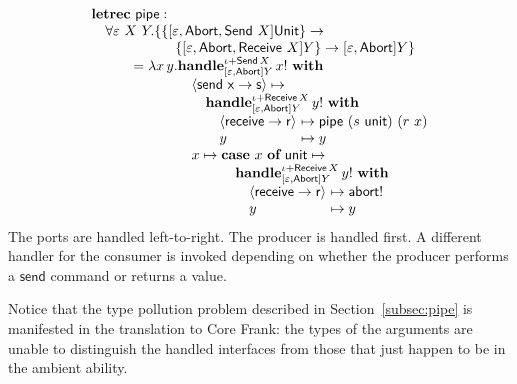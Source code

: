 \documentclass[11pt]{article}
\makeatletter
\newcommand\ba{\begin{array}}
\newcommand\ea{\end{array}}
\newcommand{\bl}{\ba[t]{@{}l@{}}}
\newcommand{\el}{\ea}
\newcommand{\effbox}[1]{[#1]}
\newcommand{\key}[1]{\textbf{#1}} %
\newcommand{\op}{\mathsf}  %
\newcommand{\con}{\mathsf} %
\newcommand{\inter}{\mathsf} %
\newcommand{\handleSymbol}{\rightarrow}
\newcommand{\handle}[2]{{#1} \handleSymbol {#2}}
\newcommand{\thunk}[1]{\{{#1}\}}
\newcommand{\evd}{\varepsilon}
\newcommand{\effin}[1]{\langle {#1} \rangle}
\newcommand{\id}{\iota}
\makeatother
\begin{document}
\[
\bl
\key{letrec}~
  \op{pipe} : \\
    \quad \forall \evd~X~Y. \{\bl
              \thunk{\effbox{\evd, \inter{Abort}, \inter{Send}~X}\con{Unit}} \to \\
              \quad \thunk{\effbox{\evd, \inter{Abort}, \inter{Receive}~X}Y} \to
                \effbox{\evd, \inter{Abort}}Y\} \\
              \el \\
\quad\qquad =
  \lambda x\,y.
    \bl
    \key{handle}^{\id + \inter{Send}\,X}_{\effbox{\evd, \inter{Abort}}Y}\,x!~\key{with} \\
       \ba{@{}r@{\quad}l@{}}
       &\op{\effin{\handle{\op{send}~x}{s}}} \mapsto \\
       &\quad
          \bl
          \key{handle}^{\id + \inter{Receive}\,X}_{\effbox{\evd, \inter{Abort}}Y}\,y!~\key{with} \\
            \ba{@{}r@{\quad}l@{~}l@{}}
                     &\op{\effin{\handle{\op{receive}}{r}}} &\mapsto \op{pipe}~(s~\op{unit})~(r~x) \\
            &y                                     &\mapsto y \\
            \ea \\
          \el \\
          &x \mapsto
             \bl
             \key{case}~x~\key{of}~\con{unit} \mapsto \\
             \quad \bl
                   \key{handle}^{\id + \inter{Receive}\,X}_{\effbox{\evd, \inter{Abort}}Y}\,y!~\key{with} \\
                      \ba{@{}r@{\quad}l@{~}l@{}}
                               &\op{\effin{\handle{\op{receive}}{r}}} &\mapsto \op{abort}! \\
                      &y                                     &\mapsto y \\
                      \ea \\
                   \el \\
             \el \\
       \ea \\
   \el \\
\el
\]
The ports are handled left-to-right. The producer is handled first. A
different handler for the consumer is invoked depending on whether the
producer performs a $\op{send}$ command or returns a value.

Notice that the type pollution problem described in
Section~\ref{subsec:pipe} is manifested in the translation to Core
Frank: the types of the arguments are unable to distinguish the handled
interfaces from those that just happen to be in the ambient ability.
\end{document}
